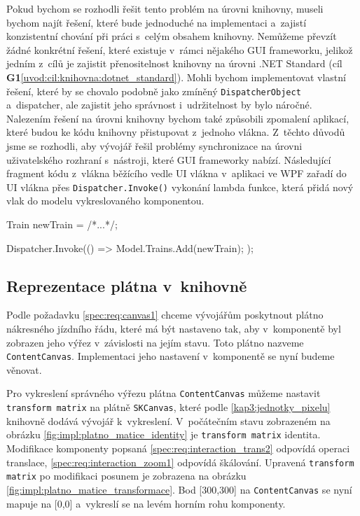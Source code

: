 Pokud bychom se rozhodli řešit tento problém na úrovni knihovny, museli bychom najít řešení, které bude jednoduché na implementaci a~zajistí konzistentní chování při práci s~celým obsahem knihovny. Nemůžeme převzít žádné konkrétní řešení, které existuje v~rámci nějakého GUI frameworku, jelikož jedním z~cílů je zajistit přenositelnost knihovny na úrovni .NET Standard (cíl \textbf{\color{goalcolor}G1}\ref{uvod:cil:knihovna:dotnet_standard}). Mohli bychom implementovat vlastní řešení, které by se chovalo podobně jako zmíněný \texttt{DispatcherObject} a~dispatcher, ale zajistit jeho správnost i~udržitelnost by bylo náročné. Nalezením řešení na úrovni knihovny bychom také způsobili zpomalení aplikací, které budou ke kódu knihovny přistupovat z~jednoho vlákna. Z~těchto důvodů jsme se rozhodli, aby vývojář řešil problémy synchronizace na úrovni uživatelského rozhraní s~nástroji, které GUI frameworky nabízí. Následující fragment kódu z~vlákna běžícího vedle UI vlákna v~aplikaci ve WPF zařadí do UI vlákna přes \texttt{Dispatcher.Invoke()}  vykonání lambda funkce, která přidá nový vlak do modelu vykreslovaného komponentou.

\begin{csharpcode}
Train newTrain = /*...*/;

Dispatcher.Invoke(() => {
	Model.Trains.Add(newTrain);
});
\end{csharpcode}

\subsection{Reprezentace plátna v~knihovně}
\label{fig:analyza_impl:platno}
Podle požadavku \ref{spec:req:canvas1} chceme vývojářům poskytnout plátno nákresného jízdního řádu, které má být nastaveno tak, aby v~komponentě byl zobrazen jeho výřez v~závislosti na jejím stavu. Toto plátno nazveme \texttt{ContentCanvas}. Implementaci jeho nastavení v~komponentě se nyní budeme věnovat.

Pro vykreslení správného výřezu plátna \texttt{ContentCanvas} můžeme nastavit \texttt{transform matrix} na plátně \texttt{SKCanvas}, které podle \ref{kap3:jednotky_pixelu} knihovně dodává vývojář k~vykreslení. V~počátečním stavu zobrazeném na obrázku \ref{fig:impl:platno_matice_identity} je \texttt{transform matrix} identita. Modifikace komponenty popsaná \ref{spec:req:interaction_trans2} odpovídá operaci translace, \ref{spec:req:interaction_zoom1} odpovídá škálování. Upravená \texttt{transform matrix} po modifikaci posunem je zobrazena na obrázku \ref{fig:impl:platno_matice_transformace}. Bod [300,300] na \texttt{ContentCanvas} se nyní mapuje na [0,0] a~vykreslí se na levém horním rohu komponenty. 

